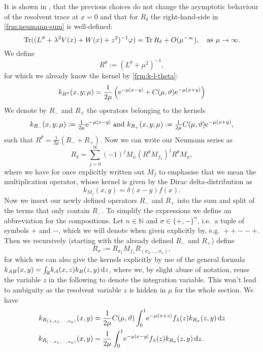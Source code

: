 It is shown in \cite[Sec.~2]{LV13}, that the previous choices do not change the
asymptotic behaviour of the resolvent trace at $x=0$ and that for $R_\delta$ the
right-hand-side in \cref{frm:neumann-sum} is well-defined:
\begin{equation*}
  \Tr((L^\theta + \lambda^2 V(x) + W(x) + z^2)^{-1}\phi) =
  \Tr R_\delta + O(\mu^{-\infty}), \quad \text{as } \mu\to\infty.
\end{equation*}
We define
\begin{equation}
  \label{frm:r-theta}
  R^\theta := (L^\theta + \mu^2)^{-1},
\end{equation}
for which we already know the kernel by \cref{frm:k-l-theta}:
\begin{equation*}
  k_{R^\theta}(x,y;\mu) = \frac1{2\mu} \left( \Eto{-\mu\Abs{x-y}} +
  C(\mu,\theta)\Eto{-\mu(x+y)}\right)
\end{equation*}
We denote by $R_-$ and $R_+$ the operators belonging to the kernels
\begin{align*}
  k_{R_-}(x,y;\mu) := \tfrac1{2\mu}\Eto{-\mu\Abs{x-y}} \text{ and }
  k_{R_+}(x,y;\mu) := \tfrac1{2\mu}C(\mu,\theta)\Eto{-\mu(x+y)},
\end{align*}
such that $R^\theta = \tfrac1{2\mu}(R_- + R_+)$. Now we can write our Neumann
series as
\begin{equation*}
  R_\delta = \sum_{j=0}^\infty (-1)^j M_\psi (R^\theta
  M_{f_\lambda})^j R^\theta M_\phi,
\end{equation*}
where we have for once explicitly written out $M_f$ to emphasise that we mean
the multiplication operator, whose kernel is given by the Dirac
delta-distribution as
\begin{equation*}
  k_{M_f}(x,y) = \delta(x-y)f(x).
\end{equation*}
Now we insert our newly defined operators $R_-$ and $R_+$ into the sum and split
of the terms that only contain $R_-$. To simplify the expressions we define an
abbreviation for the compositions. Let $n\in\mathbb{N}$ and $\sigma \in
\{+,-\}^n$, i.e.\ a tuple of symbols $+$ and $-$, which we will denote when
given explicitly by, e.g.\ $++--+$. Then we recursively (starting with the
already defined $R_-$ and $R_+$) define
\begin{equation}
  R_\sigma := R_{\sigma_1} M_{f_\lambda} R_{(\sigma_2,\ldots,\sigma_{n})},
\end{equation}
for which we can also give the kernels explicitly by use of the general formula
$k_{AB}(x,y) = \Integ{\mathbb{R}}{z}{k_A(x,z)k_B(z,y)}$, where we, by slight
abuse of notation, reuse the variable $z$ in the following to denote the
integration variable.  This won't lead to ambiguity as the resolvent variable
$z$ is hidden in $\mu$ for the whole section. We have
\begin{align}
  \label{eqn:kernel-plus}
  k_{R_{(+,\sigma_1,\ldots,\sigma_n)}}(x,y) &=
  \frac1{2\mu}C(\mu,\theta)\Int{z}{\Eto{-\mu(x+z)}f_\lambda(z)
  k_{R_\sigma}(z,y)} \\
  \label{eqn:kernel-minus}
  k_{R_{(-,\sigma_1,\ldots,\sigma_n)}}(x,y) &=
  \frac1{2\mu}\Int{z}{\Eto{-\mu\Abs{x-y}}f_\lambda(z) k_{R_\sigma}(z,y)}.
\end{align}

